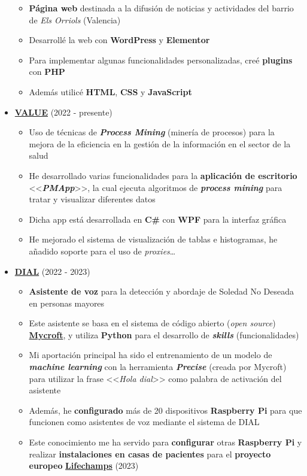 \documentclass[letterpaper, 12pt, dvipsnames]{article}
\begin{document}
\begin{itemize}
\begin{itemize}
              \item \textbf{Página web} destinada a la difusión de noticias y actividades del barrio de \emph{Els Orriols} (Valencia)
              \item Desarrollé la web con \textbf{WordPress} y \textbf{Elementor}
              \item Para implementar algunas funcionalidades personalizadas, creé \textbf{plugins} con \textbf{PHP}
              \item Además utilicé \textbf{HTML}, \textbf{CSS} y \textbf{JavaScript}
          \end{itemize}
    \item {\large\textbf{\href{https://www.sabien.upv.es/project/value/}{VALUE}}} (2022 - presente)
          \begin{itemize}
              \item Uso de técnicas de \textbf{\emph{Process Mining}} (minería de procesos) para la mejora de la eficiencia en la gestión de la información en el sector de la salud
              \item He desarrollado varias funcionalidades para la \textbf{aplicación de escritorio} <<\textbf{\emph{PMApp}}>>, la cual ejecuta algoritmos de \textbf{\emph{process mining}} para tratar y visualizar diferentes datos
              \item Dicha app está desarrollada en \textbf{C\#} con \textbf{WPF} para la interfaz gráfica
              \item He mejorado el sistema de visualización de tablas e histogramas, he añadido soporte para el uso de \emph{proxies}\dots
          \end{itemize}
    \item {\large\textbf{\href{http://www.sabien.upv.es/project/dial/}{DIAL}}} (2022 - 2023)
          \begin{itemize}
              \item \textbf{Asistente de voz} para la detección y abordaje de Soledad No Deseada en personas mayores
              \item Este asistente se basa en el sistema de código abierto (\emph{open source}) \textbf{\href{https://mycroft.ai/}{Mycroft}}, y utiliza \textbf{Python} para el desarrollo de \textbf{\emph{skills}} (funcionalidades)
              \item Mi aportación principal ha sido el entrenamiento de un modelo de \textbf{\emph{machine learning}} con la herramienta \textbf{\emph{Precise}} (creada por Mycroft) para utilizar la frase <<\emph{Hola dial}>> como palabra de activación del asistente
              \item Además, he \textbf{configurado} más de 20 dispositivos \textbf{Raspberry Pi} para que funcionen como asistentes de voz mediante el sistema de DIAL
              \item Este conocimiento me ha servido para \textbf{configurar} otras \textbf{Raspberry Pi} y realizar \textbf{instalaciones en casas de pacientes} para el \textbf{proyecto europeo} \textbf{\href{http://www.sabien.upv.es/project/lifechamps/}{Lifechamps}} (2023)
          \end{itemize}
\end{itemize}
\end{document}
